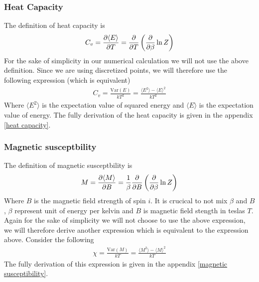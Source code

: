 \documentclass[a4paper, 10pt]{article}
\begin{document}
\subsubsection{Heat Capacity} The definition of heat capacity is
\begin{align}
  C_{v} = \pdv{\langle E \rangle}{T} = \pdv{T}\left(\pdv{\beta}\ln{Z}\right)
\end{align}
For the sake of simplicity in our numerical calculation we will not use the above definition. Since we are
using discretized points, we will therefore use the following expression (which is equivalent)
\begin{align}
  C_{v} = \frac{\mathrm{Var}(E)}{kT^{2}} =\frac{\langle E ^{2} \rangle - \langle E \rangle^{2}}{kT^{2}}
\label{heat capacity}
\end{align}
Where $\langle E ^{2} \rangle$ is the expectation value of squared energy and $\langle E \rangle$ is the expectation value of energy.
The fully derivation of the heat capacity is given
in the appendix \eqref{heat capacity}.
\subsubsection{Magnetic susceptbility} The definition of magnetic susceptbility is
\begin{align}
  M = \pdv{\langle M \rangle}{B} = \frac{1}{\beta}\pdv{B}\left(\pdv{\beta}\ln{Z}\right)
\end{align}
Where $B$ is the magnetic field strength of spin $i$. It is crucical to not
mix $\beta$ and $B$, $\beta$ represent unit of energy per kelvin and $B$ is magnetic field stength in teslas $T$.
Again for the sake of simplicity we will not choose to use the above expression, we will therefore
derive another expression which is equivalent to the expression above. Consider the following
\begin{align}
  \chi = \frac{\mathrm{Var}(M)}{kT} =
  \frac{\langle M ^{2} \rangle - \langle M \rangle^{2}}{kT}
  \label{magsus}
\end{align}
The fully derivation of this expression is given in the appendix \eqref{magnetic susceptibility}.
\end{document}
